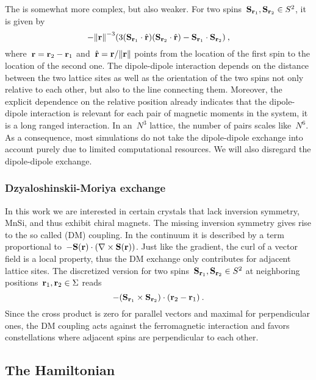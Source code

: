 The  is somewhat more complex, but also
weaker. For two spins~$\mathbf{S}_{\mathbf{r}_1}, \mathbf{S}_{\mathbf{r}_2} \in S^2$, it is given by
%
\begin{equation}
  - {\norm{\r}^{-3}} (3 (\S_{\r_1} \cdot \hat{\r})
  (\S_{\r_2} \cdot \hat{\r}) - \S_{\r_1} \cdot \S_{\r_2})\:,
\end{equation}
%
where~$\mathbf{r} = \mathbf{r}_2 - \mathbf{r}_1$ and~$\hat{\r} = \r / \norm{\r}$ points from the
location of the first spin to the location of the second one. The dipole-dipole
interaction depends on the distance between the two lattice sites as well as the
orientation of the two spins not only relative to each other, but also to the
line connecting them. Moreover, the explicit dependence on the relative position
already indicates that the dipole-dipole interaction is relevant for each pair
of magnetic moments in the system, it is a long ranged interaction. In an~$N^3$
lattice, the number of pairs scales like~$N^6$. As a consequence, most
simulations do not take the dipole-dipole exchange into account purely due to
limited computational resources. We will also disregard the dipole-dipole
exchange.

\subsubsection{Dzyaloshinskii-Moriya exchange}

In this work we are interested in certain crystals that lack inversion symmetry,
\eg{} MnSi, and thus exhibit chiral magnets. The missing inversion symmetry
gives rise to the so called  (DM) coupling.
In the continuum it is described by a term proportional to~$-\mathbf{S}(\mathbf{r}) \cdot
(\nabla \times \mathbf{S}(\mathbf{r}))$. Just like the gradient, the curl of a vector field is a
local property, thus the DM exchange only contributes for adjacent lattice
sites. The discretized version for two spins~$\mathbf{S}_{\mathbf{r}_1}, \mathbf{S}_{\mathbf{r}_2} \in S^2$ at
neighboring positions~$\mathbf{r}_1, \mathbf{r}_2 \in \Sigma$ reads
\begin{equation}
  - (\mathbf{S}_{\mathbf{r}_1} \times \mathbf{S}_{\mathbf{r}_2}) \cdot (\mathbf{r}_2 - \mathbf{r}_1)\:.
\end{equation}
%
Since the cross product is zero for parallel vectors and maximal for
perpendicular ones, the DM coupling acts against the ferromagnetic interaction
and favors constellations where adjacent spins are perpendicular to each other.

\subsection{The Hamiltonian}

